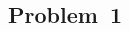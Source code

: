 \documentclass[11pt, letterpaper]{article}
\begin{document}










\begin{solution}{1}
\subsection*{Problem~1}
\begin{question}

\end{question}

\end{solution}
\end{document}
